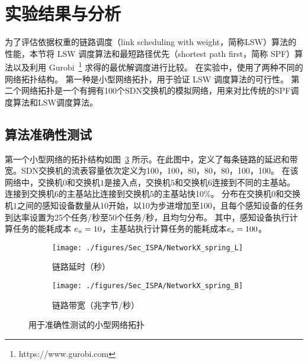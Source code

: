 
\section{实验结果与分析}

为了评估依据权重的链路调度（link scheduling with weight，简称LSW）算法的性能，本节将 LSW 调度算法和最短路径优先（shortest path first，简称 SPF）算法以及利用 Gurobi~\footnote{https://www.gurobi.com} 求得的最优解调度进行比较。
在实验中，使用了两种不同的网络拓扑结构。
第一种是小型网络拓扑，用于验证 LSW 调度算法的可行性。
第二个网络拓扑是一个有拥有100个SDN交换机的模拟网络，用来对比传统的SPF调度算法和LSW调度算法。

\subsection{算法准确性测试}

第一个小型网络的拓扑结构如图~\ref{fig_smallNetwork} 所示。在此图中，定义了每条链路的延迟和带宽。SDN交换机的流表容量依次定义为100，100，80，80，80，100，100。
在该网络中，交换机$0$和交换机$1$是接入点，交换机$5$和交换机$6$连接到不同的主基站。
连接到交换机$6$的主基站比连接到交换机$5$的主基站快10\%。
分布在交换机$0$和交换机$1$之间的感知设备数量从10开始，以10为步进增加至100，且每个感知设备的任务到达率设置为25个任务/秒至50个任务/秒，且均匀分布。
其中，感知设备执行计算任务的能耗成本 $e_u=10$，主基站执行计算任务的能耗成本$e_s=100$。

\begin{figure}[!h]
  \centering
  \begin{subfigure}[b]{0.45\linewidth}
    \texttt{[image: ./figures/Sec\_ISPA/NetworkX\_spring\_L]}
    \label{fig_smallNetworkL}
    \caption{链路延时（秒）}
  \end{subfigure} %
  \begin{subfigure}[b]{0.45\linewidth}    
    \texttt{[image: ./figures/Sec\_ISPA/NetworkX\_spring\_B]}
    \label{fig_smallNetworkB}
    \caption{链路带宽（兆字节/秒）}
  \end{subfigure} 
  \caption{用于准确性测试的小型网络拓扑}
  \label{fig_smallNetwork}
\end{figure}

